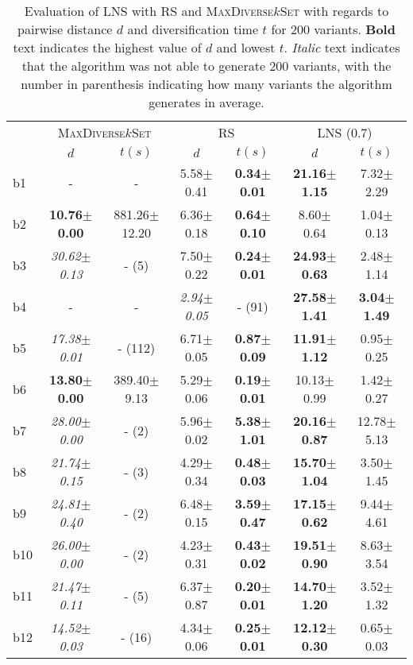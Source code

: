 \begin{longtable}{|l|c|c|c|c|c|c|}
\caption{\label{tab:dist_max_rs_lns} Evaluation of \ac{LNS} with \ac{RS} and \textsc{MaxDiverse$k$Set}
		with regards to pairwise distance $d$ and diversification time $t$ for 200 variants. \textbf{Bold} text indicates the highest value of $d$
		and lowest $t$. \textit{Italic} text indicates that the algorithm was not able to generate
		200 variants, with the number in parenthesis indicating how many variants the algorithm generates in average.}\\
\hline
&\multicolumn{2}{c|}{\textsc{MaxDiverse$k$Set}}&\multicolumn{2}{c|}{{RS}}&\multicolumn{2}{c|}{LNS (0.7)}\\
\cline{2-7}
&$d$&$t(s)$&$d$&$t(s)$&$d$&$t(s)$\\
\hline
b1&- & -&5.58$\pm$0.41 & \textbf{0.34$\pm$0.01}&\textbf{21.16$\pm$1.15} & 7.32$\pm$2.29
\\
b2&\textbf{10.76$\pm$0.00} & 881.26$\pm$12.20&6.36$\pm$0.18 & \textbf{0.64$\pm$0.10}&8.60$\pm$0.64 & 1.04$\pm$0.13
\\
b3&\textit{30.62$\pm$0.13} & - (5)&7.50$\pm$0.22 & \textbf{0.24$\pm$0.01}&\textbf{24.93$\pm$0.63} & 2.48$\pm$1.14
\\
b4&- & -&\textit{2.94$\pm$0.05} & - (91)&\textbf{27.58$\pm$1.41} & \textbf{3.04$\pm$1.49}
\\
b5&\textit{17.38$\pm$0.01} & - (112)&6.71$\pm$0.05 & \textbf{0.87$\pm$0.09}&\textbf{11.91$\pm$1.12} & 0.95$\pm$0.25
\\
b6&\textbf{13.80$\pm$0.00} & 389.40$\pm$9.13&5.29$\pm$0.06 & \textbf{0.19$\pm$0.01}&10.13$\pm$0.99 & 1.42$\pm$0.27
\\
b7&\textit{28.00$\pm$0.00} & - (2)&5.96$\pm$0.02 & \textbf{5.38$\pm$1.01}&\textbf{20.16$\pm$0.87} & 12.78$\pm$5.13
\\
b8&\textit{21.74$\pm$0.15} & - (3)&4.29$\pm$0.34 & \textbf{0.48$\pm$0.03}&\textbf{15.70$\pm$1.04} & 3.50$\pm$1.45
\\
b9&\textit{24.81$\pm$0.40} & - (2)&6.48$\pm$0.15 & \textbf{3.59$\pm$0.47}&\textbf{17.15$\pm$0.62} & 9.44$\pm$4.61
\\
b10&\textit{26.00$\pm$0.00} & - (2)&4.23$\pm$0.31 & \textbf{0.43$\pm$0.02}&\textbf{19.51$\pm$0.90} & 8.63$\pm$3.54
\\
b11&\textit{21.47$\pm$0.11} & - (5)&6.37$\pm$0.87 & \textbf{0.20$\pm$0.01}&\textbf{14.70$\pm$1.20} & 3.52$\pm$1.32
\\
b12&\textit{14.52$\pm$0.03} & - (16)&4.34$\pm$0.06 & \textbf{0.25$\pm$0.01}&\textbf{12.12$\pm$0.30} & 0.65$\pm$0.03

\end{longtable}
